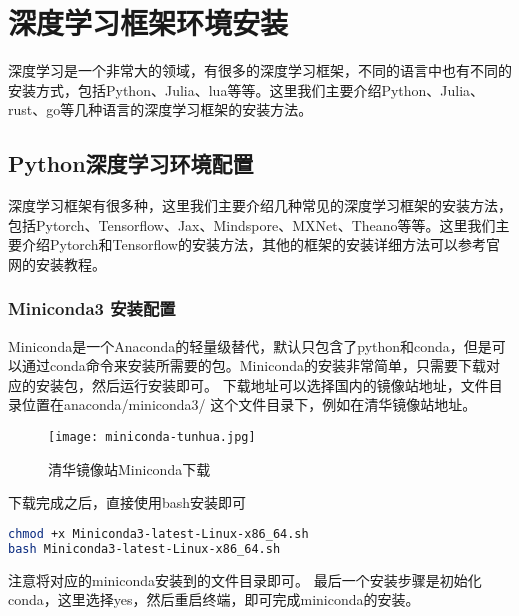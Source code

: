 \documentclass[lang=cn,a4paper,newtx]{elegantpaper}
\begin{document}
\section{深度学习框架环境安装}
深度学习是一个非常大的领域，有很多的深度学习框架，不同的语言中也有不同的安装方式，包括Python、Julia、lua等等。这里我们主要介绍Python、Julia、rust、go等几种语言的深度学习框架的安装方法。
\subsection{Python深度学习环境配置}
深度学习框架有很多种，这里我们主要介绍几种常见的深度学习框架的安装方法，包括Pytorch、Tensorflow、Jax、Mindspore、MXNet、Theano等等。这里我们主要介绍Pytorch和Tensorflow的安装方法，其他的框架的安装详细方法可以参考官网的安装教程。
\subsubsection{Miniconda3 安装配置}
Miniconda是一个Anaconda的轻量级替代，默认只包含了python和conda，但是可以通过conda命令来安装所需要的包。Miniconda的安装非常简单，只需要下载对应的安装包，然后运行安装即可。
下载地址可以选择国内的镜像站地址，文件目录位置在anaconda/miniconda3/ 这个文件目录下，例如在清华镜像站地址。
\begin{figure}[hbpt]
  \centering
  \texttt{[image: miniconda-tunhua.jpg]}
  \caption{清华镜像站Miniconda下载}
  \label{fig:miniconda-tunhua}
\end{figure}

下载完成之后，直接使用bash安装即可
\begin{lstlisting}[language=bash]
chmod +x Miniconda3-latest-Linux-x86_64.sh
bash Miniconda3-latest-Linux-x86_64.sh
\end{lstlisting}
注意将对应的miniconda安装到的文件目录即可。
最后一个安装步骤是初始化conda，这里选择yes，然后重启终端，即可完成miniconda的安装。
\end{document}
